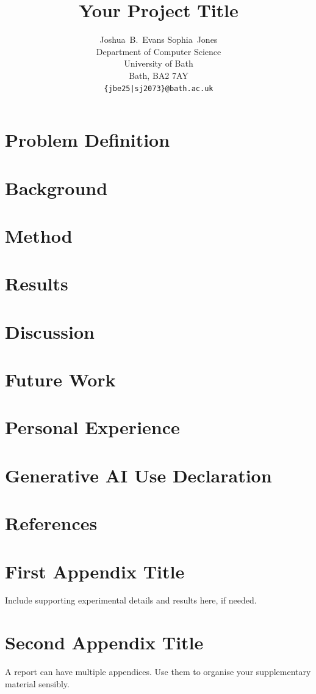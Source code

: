\documentclass[letterpaper]{article}
\title{Your Project Title}
\author{
  Joshua~B.~Evans \qquad Sophia~Jones \\
  Department of Computer Science \\
  University of Bath \\
  Bath, BA2 7AY \\
  \texttt{\{jbe25|sj2073\}@bath.ac.uk}
}
\begin{document}
\maketitle

\section{Problem Definition}

\section{Background}

\section{Method}

\section{Results}

\section{Discussion}

\section{Future Work}

\section{Personal Experience}

\section*{Generative AI Use Declaration}

\section*{References}
\small

\normalsize
\clearpage

\appendix

\section{First Appendix Title}
Include supporting experimental details and results here, if needed.

\section{Second Appendix Title}
A report can have multiple appendices. Use them to organise your supplementary material sensibly.
\end{document}

